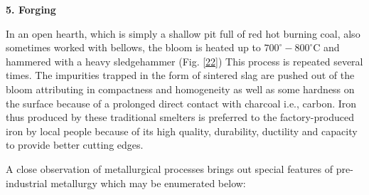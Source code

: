 \noindent \textbf{\large 5.  Forging}

In an open hearth, which is simply a shallow pit full of red hot burning coal, also sometimes worked with bellows, the bloom is heated up to $700^\circ-800^\circ$C and hammered with a heavy sledgehammer (Fig. \ref{22}) This process is repeated several times. The impurities trapped in the form of sintered slag are pushed out of the bloom attributing in compactness and homogeneity as well as some hardness on the surface because of a prolonged direct contact with charcoal i.e., carbon. Iron thus produced by these traditional smelters is preferred to the factory-produced iron by local people because of its high quality, durability, ductility and capacity to provide better cutting edges.	

A close observation of metallurgical processes brings out special features of pre-industrial metallurgy which may be enumerated below:

